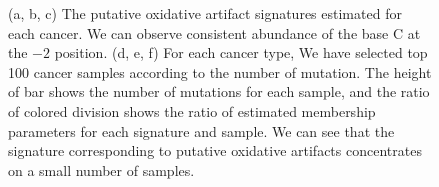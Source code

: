 \documentclass{article}
\begin{document}
\begin{figure}
\quad
{}

  \caption{(a, b, c) The putative oxidative artifact signatures estimated for each cancer.
  We can observe consistent abundance of the base C at the $-2 $ position.
  (d, e, f) For each cancer type, 
We have selected top 100 cancer samples according to the number of mutation.
The height of bar shows the number of mutations for each sample,
and the ratio of colored division shows the ratio of estimated membership parameters for each signature and sample.
We can see that the signature corresponding to putative oxidative artifacts concentrates on a small number of samples.}

\end{figure}
\end{document}
